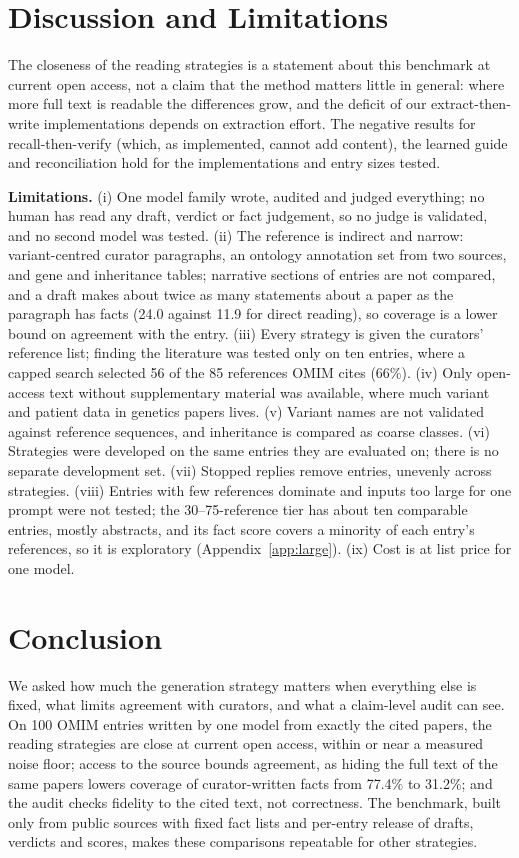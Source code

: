 \documentclass{article} %
\begin{document}
\section{Discussion and Limitations}
\label{sec:discussion}
The closeness of the reading strategies is a statement about this benchmark at current open access, not a claim that the method matters little in general: where more full text is readable the differences grow, and the deficit of our extract-then-write implementations depends on extraction effort. The negative results for recall-then-verify (which, as implemented, cannot add content), the learned guide and reconciliation hold for the implementations and entry sizes tested.

\textbf{Limitations.} (i) One model family wrote, audited and judged everything; no human has read any draft, verdict or fact judgement, so no judge is validated, and no second model was tested. (ii) The reference is indirect and narrow: variant-centred curator paragraphs, an ontology annotation set from two sources, and gene and inheritance tables; narrative sections of entries are not compared, and a draft makes about twice as many statements about a paper as the paragraph has facts (24.0 against 11.9 for direct reading), so coverage is a lower bound on agreement with the entry. (iii) Every strategy is given the curators' reference list; finding the literature was tested only on ten entries, where a capped search selected 56 of the 85 references OMIM cites (66\%). (iv) Only open-access text without supplementary material was available, where much variant and patient data in genetics papers lives. (v) Variant names are not validated against reference sequences, and inheritance is compared as coarse classes. (vi) Strategies were developed on the same entries they are evaluated on; there is no separate development set. (vii) Stopped replies remove entries, unevenly across strategies. (viii) Entries with few references dominate and inputs too large for one prompt were not tested; the 30--75-reference tier has about ten comparable entries, mostly abstracts, and its fact score covers a minority of each entry's references, so it is exploratory (Appendix~\ref{app:large}). (ix) Cost is at list price for one model.

\section{Conclusion}
\label{sec:conclusion}
We asked how much the generation strategy matters when everything else is fixed, what limits agreement with curators, and what a claim-level audit can see. On 100 OMIM entries written by one model from exactly the cited papers, the reading strategies are close at current open access, within or near a measured noise floor; access to the source bounds agreement, as hiding the full text of the same papers lowers coverage of curator-written facts from 77.4\% to 31.2\%; and the audit checks fidelity to the cited text, not correctness. The benchmark, built only from public sources with fixed fact lists and per-entry release of drafts, verdicts and scores, makes these comparisons repeatable for other strategies.
\end{document}
